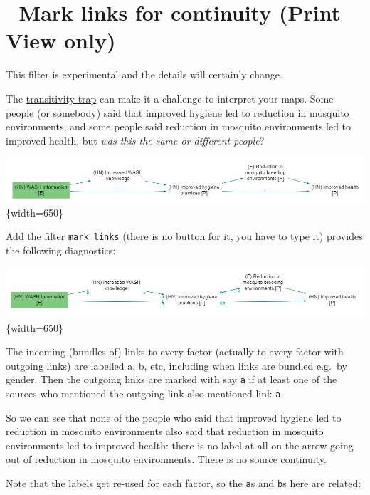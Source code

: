 \documentclass[
]{book}
\begin{document}
\hypertarget{mark-links-for-continuity-print-view-only}{%
\section{🧪 Mark links for continuity (Print View only)}\label{mark-links-for-continuity-print-view-only}}

This filter is experimental and the details will certainly change.

The \protect\hyperlink{xtransitivity-trap}{transitivity trap} can make it a challenge to interpret your maps. Some people (or somebody) said that improved hygiene led to reduction in mosquito environments, and some people said reduction in mosquito environments led to improved health, but \emph{was this the same or different people}?

\includegraphics[width=6.77083in,height=\textheight]{_assets/image-20211215081735743.png}\{width=650\}

Add the filter \texttt{mark\ links} (there is no button for it, you have to type it) provides the following diagnostics:

\includegraphics[width=6.77083in,height=\textheight]{_assets/image-20211215081328481.png}\{width=650\}

The incoming (bundles of) links to every factor (actually to every factor with outgoing links) are labelled a, b, etc, including when links are bundled e.g.~by gender. Then the outgoing links are marked with say \texttt{a} if at least one of the sources who mentioned the outgoing link also mentioned link \texttt{a}.

So we can see that none of the people who said that improved hygiene led to reduction in mosquito environments also said that reduction in mosquito environments led to improved health: there is no label at all on the arrow going out of reduction in mosquito environments. There is no source continuity.

Note that the labels get re-used for each factor, so the \texttt{a}s and \texttt{b}s here are related:
\end{document}
